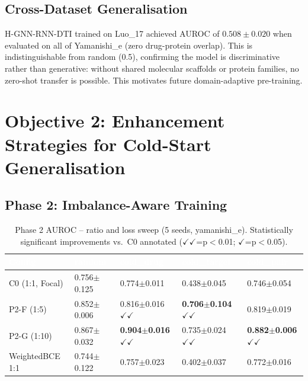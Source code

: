 \documentclass[12pt,a4paper,oneside]{report}
\newcommand{\sig}[1]{\textbf{#1}}
\begin{document}
\subsection{Cross-Dataset Generalisation}

H-GNN-RNN-DTI trained on Luo\_17 achieved AUROC of $0.508 \pm 0.020$ when evaluated on all of Yamanishi\_e (zero drug-protein overlap). This is indistinguishable from random (0.5), confirming the model is discriminative rather than generative: without shared molecular scaffolds or protein families, no zero-shot transfer is possible. This motivates future domain-adaptive pre-training.

\section{Objective 2: Enhancement Strategies for Cold-Start Generalisation}

\subsection{Phase 2: Imbalance-Aware Training}

\begin{table}[htbp]
\centering
\caption{Phase 2 AUROC -- ratio and loss sweep (5 seeds, yamanishi\_e). Statistically significant improvements vs.\ C0 annotated ($\checkmark\checkmark$=p${<}$0.01; $\checkmark$=p${<}$0.05).}
\label{tab:phase2-yam}
\begin{tabular}{@{}L{2.4cm}C{1.8cm}C{1.8cm}C{1.8cm}C{1.8cm}@{}}
\toprule
{}
\textcolor{white}{\textbf{Config}} &
\textcolor{white}{\textbf{random}} &
\textcolor{white}{\textbf{cold\_drug}} &
\textcolor{white}{\textbf{cold\_target}} &
\textcolor{white}{\textbf{cold\_pair}} \\
\midrule
{}
C0 (1:1, Focal) & 0.756$\pm$0.125 & 0.774$\pm$0.011 & 0.438$\pm$0.045 & 0.746$\pm$0.054 \\
P2-F (1:5)      & 0.852$\pm$0.006 & 0.816$\pm$0.016 $\checkmark\checkmark$ & \sig{0.706$\pm$0.104} $\checkmark\checkmark$ & 0.819$\pm$0.019 \\
P2-G (1:10)     & 0.867$\pm$0.032 & \sig{0.904$\pm$0.016} $\checkmark\checkmark$ & 0.735$\pm$0.024 $\checkmark\checkmark$ & \sig{0.882$\pm$0.006} $\checkmark\checkmark$ \\
WeightedBCE 1:1 & 0.744$\pm$0.122 & 0.757$\pm$0.023 & 0.402$\pm$0.037 & 0.772$\pm$0.016 \\
\bottomrule
\end{tabular}
\end{table}
\end{document}

